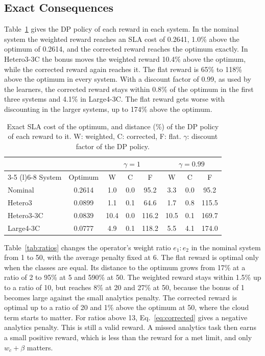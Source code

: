 \documentclass[journal]{IEEEtran}
\begin{document}
\subsection{Exact Consequences}
Table~\ref{tab:dprewards} gives the DP policy of each reward in each system. In the nominal system the weighted reward reaches an SLA cost of 0.2641, 1.0\% above the optimum of 0.2614, and the corrected reward reaches the optimum exactly. In Hetero3-3C the bonus moves the weighted reward 10.4\% above the optimum, while the corrected reward again reaches it. The flat reward is 65\% to 118\% above the optimum in every system. With a discount factor of 0.99, as used by the learners, the corrected reward stays within 0.8\% of the optimum in the first three systems and 4.1\% in Large4-3C. The flat reward gets worse with discounting in the larger systems, up to 174\% above the optimum.

\begin{table}[t]
\caption{Exact SLA cost of the optimum, and distance (\%) of the DP policy of each reward to it. W: weighted, C: corrected, F: flat. $\gamma$: discount factor of the DP policy.}
\label{tab:dprewards}
\centering
\footnotesize
\setlength{\tabcolsep}{2.6pt}
\begin{tabular}{@{}lccccccc@{}}
\toprule
 & & \multicolumn{3}{c}{$\gamma = 1$} & \multicolumn{3}{c}{$\gamma = 0.99$} \\
\cmidrule(lr){3-5} \cmidrule(l){6-8}
System & Optimum & W & C & F & W & C & F \\
\midrule
Nominal & 0.2614 & 1.0 & 0.0 & 95.2 & 3.3 & 0.0 & 95.2 \\
Hetero3 & 0.0899 & 1.1 & 0.1 & 64.6 & 1.7 & 0.8 & 115.5 \\
Hetero3-3C & 0.0839 & 10.4 & 0.0 & 116.2 & 10.5 & 0.1 & 169.7 \\
Large4-3C & 0.0777 & 4.9 & 0.1 & 118.2 & 5.5 & 4.1 & 174.0 \\
\bottomrule
\end{tabular}
\end{table}

Table~\ref{tab:ratios} changes the operator's weight ratio $e_1 : e_2$ in the nominal system from 1 to 50, with the average penalty fixed at 6. The flat reward is optimal only when the classes are equal. Its distance to the optimum grows from 17\% at a ratio of 2 to 95\% at 5 and 590\% at 50. The weighted reward stays within 1.5\% up to a ratio of 10, but reaches 8\% at 20 and 27\% at 50, because the bonus of 1 becomes large against the small analytics penalty. The corrected reward is optimal up to a ratio of 20 and 1\% above the optimum at 50, where the cloud term starts to matter. For ratios above 13, Eq.~\eqref{eq:corrected} gives a negative analytics penalty. This is still a valid reward. A missed analytics task then earns a small positive reward, which is less than the reward for a met limit, and only $w_c + \beta$ matters.
\end{document}
